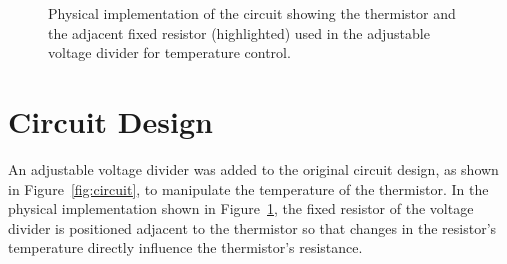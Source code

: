 \documentclass[12pt,a4paper]{article}
\begin{document}
\begin{figure}[h]
  \centering
  \caption{Physical implementation of the circuit showing the thermistor and the adjacent fixed resistor (highlighted) used in the adjustable voltage divider for temperature control.}
  \label{fig:actual-circuit}
\end{figure}


\section{Circuit Design}
An adjustable voltage divider was added to the original circuit design, as shown in Figure~\ref{fig:circuit}, to manipulate the temperature of the thermistor. In the physical implementation shown in Figure~\ref{fig:actual-circuit}, the fixed resistor of the voltage divider is positioned adjacent to the thermistor so that changes in the resistor’s temperature directly influence the thermistor’s resistance.
\end{document}
